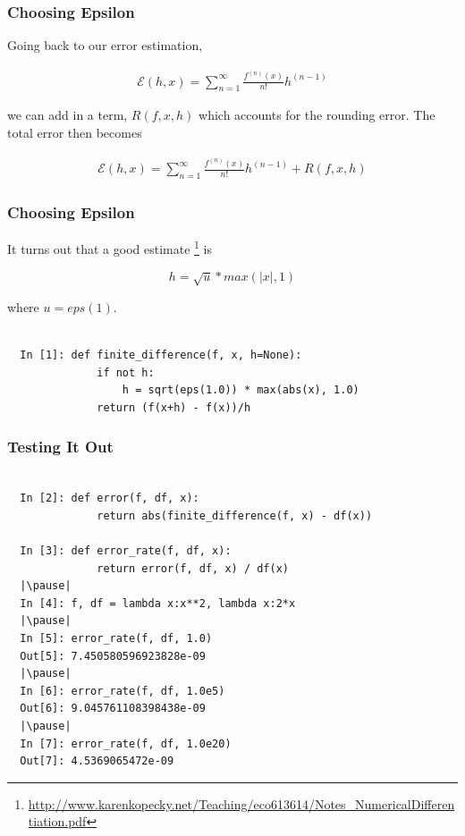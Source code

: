 \documentclass{beamer}
\def\abs#1{| #1 |}
\begin{document}
\begin{frame}[fragile]
\frametitle{Choosing Epsilon}

Going back to our error estimation,

\begin{eqnarray*} \mathcal{E}(h, x) = \sum_{n = 1}^{\infty} \frac{f^{(n)}(x)}{n!}h^{(n-1)} \end{eqnarray*}

we can add in a term, $R(f, x, h)$ which accounts for the rounding error. The total error then becomes

\begin{eqnarray*} \mathcal{E}(h, x) = \sum_{n = 1}^{\infty} \frac{f^{(n)}(x)}{n!}h^{(n-1)} + R(f, x, h) \end{eqnarray*}

\end{frame}

\begin{frame}[fragile]
\frametitle{Choosing Epsilon}


It turns out that a good estimate \footnote{\url{http://www.karenkopecky.net/Teaching/eco613614/Notes_NumericalDifferentiation.pdf}} is

\[ h = \sqrt{u} * max(\abs{x}, 1) \]

where $u = eps(1)$.
\pause
\begin{lstlisting}

  In [1]: def finite_difference(f, x, h=None):
              if not h:
                  h = sqrt(eps(1.0)) * max(abs(x), 1.0)
              return (f(x+h) - f(x))/h

\end{lstlisting}

\end{frame}

\begin{frame}[fragile]
\frametitle{Testing It Out}

\begin{lstlisting}

  In [2]: def error(f, df, x):
              return abs(finite_difference(f, x) - df(x))

  In [3]: def error_rate(f, df, x):
              return error(f, df, x) / df(x)
  |\pause|
  In [4]: f, df = lambda x:x**2, lambda x:2*x
  |\pause|
  In [5]: error_rate(f, df, 1.0)
  Out[5]: 7.450580596923828e-09
  |\pause|
  In [6]: error_rate(f, df, 1.0e5)
  Out[6]: 9.045761108398438e-09
  |\pause|
  In [7]: error_rate(f, df, 1.0e20)
  Out[7]: 4.5369065472e-09
\end{lstlisting}

\end{frame}
\end{document}
